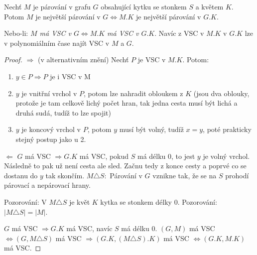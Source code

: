 \begin{lemma}
	Nechť $M$ je párování v grafu $G$ obsahující kytku se stonkem $S$ a květem $K$. Potom $M$ je největší párování v $G \Leftrightarrow M.K$ je největší párování v $G.K$.
\end{lemma}

Nebo-li: \textit{$M$ má VSC v $G \Leftrightarrow M.K$ má VSC v $G.K$}. Navíc z VSC v $M.K$ v $G.K$ lze v polynomiálním čase najít VSC v $M$ a $G$.

\begin{proof}
	$\Rightarrow$ (v alternativním znění) Nechť $P$ je VSC v $M.K$. Potom:
	
	\begin{enumerate}
		\item $y \in P \Rightarrow P$ je i VSC v M
		\item $y$ je vnitřní vrchol v $P$, potom lze nahradit obloukem z $K$ (jsou dva oblouky, protože je tam celkově lichý počet hran, tak jedna cesta musí být lichá a druhá sudá, tudíž to lze spojit)
		\item $y$ je koncový vrchol v $P$, potom $y$ musí být volný, tudíž $x=y$, poté prakticky stejný postup jako u 2.
	\end{enumerate}
	
	$\Leftarrow$ $G$ má VSC $\Rightarrow G.K$ má VSC, pokud $S$ má délku $0$, to jest $y$ je volný vrchol. Následně to pak už není cesta ale sled. Začnu tedy z konce cesty a poprvé co se dostanu do $y$ tak skončím. $M \triangle S:$ Párování v $G$ vznikne tak, že se na $S$ prohodí párovací a nepárovací hrany.
	
	Pozorování: V $M \triangle S$ je květ $K$ kytka se stonkem délky $0$. Pozorování: $|M \triangle S| = |M|$.
	
	$G$ má VSC $\Rightarrow G.K$ má VSC, navíc $S$ má délku $0$. $(G,M)$ má VSC $\Leftrightarrow (G, M \triangle S)$ má VSC $\Rightarrow (G.K, (M \triangle S).K)$ má VSC $\Leftrightarrow (G.K, M.K)$ má VSC.
\end{proof}

